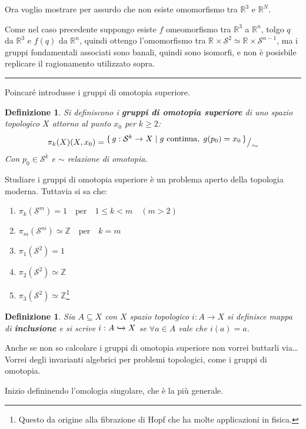 \documentclass[10pt, twoside=false, x11names]{scrbook}
\newtheorem{definition}[theorem]{Definizione}
\newenvironment{proof}{{\textbf{Dimostrazione}:}}{\hfill\rule{2mm}{2mm} \newline}
\newcommand{\Z}{\mathbb{Z}}
\newcommand{\RN}[1][]{\mathbb{R}^#1}
\newcommand{\Sph}[1][]{\mathcal{S}^#1}
\newcommand{\incl}{\xhookrightarrow{}}
\newcommand*\quot[2]{{^{\textstyle #1}\big/_{\textstyle #2}}}
\begin{document}
Ora voglio mostrare per assurdo che non esiste omomorfismo tra $ \RN{3} $ e $ \RN{N} $.

\begin{proof}
  Come nel caso precedente suppongo esiste $ f $ omeomorfismo tra $ \RN{3} $ a $ \RN{n} $,
  tolgo $ q $ da $ \RN{3} $ e $ f(q) $ da $ \RN{n} $, quindi ottengo
  l'omomorfismo tra $ \RN{} \times \Sph{2} \simeq \RN{} \times \Sph{n-1} $, ma i gruppi fondamentali
  associati sono banali, quindi sono isomorfi, e non è posisbile replicare il ragionamento utilizzato sopra.
\end{proof}

Poincaré introdusse i gruppi di omotopia superiore.

\begin{definition}
  Si definiscono i \textbf{gruppi di omotopia superiore} di uno spazio topologico $ X $
  attorno al punto $ x_0 $ per $ k \geq 2 $:
  \[
    \pi_k(X) (X, x_0) = \quot{\set{ g: \Sph{k} \to X | g \text{ continua}, \; g(p_0) = x_0}}{\sim}
  \]
  Con $ p_0 \in \Sph{k} $ e $ \sim $ relazione di omotopia.
\end{definition}
Studiare i gruppi di omotopia superiore è un problema aperto della topologia moderna.
Tuttavia si sa che:
\begin{enumerate}
\item $ \pi_k(\Sph{m}) = 1 \quad \text{per} \quad 1 \leq k < m \quad (m > 2)$
\item $ \pi_m(\Sph{m}) \simeq \Z \quad \text{per} \quad k = m $
\item $ \pi_1(\Sph{2}) = 1 $
\item $ \pi_2(\Sph{2}) \simeq \Z $
\item $ \pi_3(\Sph{2}) \simeq \Z $\footnote{Questo da origine alla fibrazione di Hopf che ha molte applicazioni in fisica.}
\end{enumerate}

\begin{definition}
  Sia $ A \subseteq X $ con $ X $ spazio topologico $ i: A \to X $ si definisce mappa di \textbf{inclusione}
  e si scrive $ i: A \incl X $ se $ \forall a \in A $ vale che $ i(a) = a $.
\end{definition}


Anche se non so calcolare i gruppi di omotopia superiore non vorrei buttarli via\dots
Vorrei degli invarianti algebrici per problemi topologici, come i gruppi di omotopia.

Inizio defininendo l'omologia singolare, che è la più generale.
\end{document}
